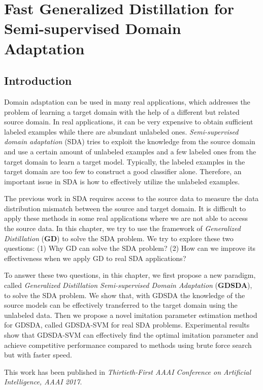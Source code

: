 \chapter{Fast Generalized Distillation for Semi-supervised Domain Adaptation}\label{sec:aaai}
\section{Introduction}
Domain adaptation can be used in many real applications, which addresses the problem of learning a target domain with the help of a different but related source domain. 
In real applications, it can be very expensive to obtain sufficient labeled examples while there are abundant unlabeled ones. 
\textit{Semi-supervised domain adaptation} (SDA) tries to exploit the knowledge from the source domain and use a certain amount of unlabeled examples and a few labeled ones from the target domain to learn a target model. Typically, the labeled examples in the target domain are too few to construct a good classifier alone. Therefore, an important issue in SDA is how to effectively utilize the unlabeled examples.

The previous work in SDA requires access to the source data to measure the data distribution mismatch between the source and target domain\cite{duan2009domain,Donahue_2013_CVPR,daume2010frustratingly,yao2015semi}. It is difficult to apply these methods in some real applications where we are not able to access the source data. In this chapter, we try to use the framework of \textit{Generalized Distillation} (\textbf{GD})\cite{lopez2015unifying} to solve the SDA problem. We try to explore these two questions: (1) Why GD can solve the SDA problem? (2) How can we improve its effectiveness when we apply GD to real SDA applications?

To answer these two questions, in this chapter, we first propose a new paradigm, called \textit{Generalized Distillation Semi-supervised Domain Adaptation} (\textbf{GDSDA}), to solve the SDA problem. We show that, with GDSDA the knowledge of the source models can be effectively transferred to the target domain using the unlabeled data. Then we propose a novel imitation parameter estimation method for GDSDA, called GDSDA-SVM for real SDA problems. Experimental results show that GDSDA-SVM can effectively find the optimal imitation parameter and achieve competitive performance compared to methods using brute force search but with faster speed. 

This work has been published in \textit{Thirtieth-First AAAI Conference on Artificial Intelligence, AAAI 2017}.

